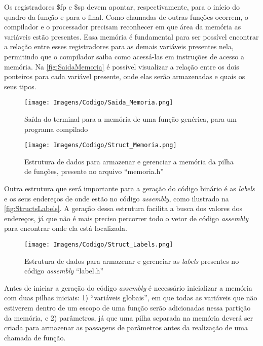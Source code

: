\documentclass[
	12pt,				%
	oneside,
	a4paper,			%
	english,			%
	french,				%
	spanish,			%
	brazil,				%
	]{abntex2}
\begin{document}
Os registradores \$fp e \$sp devem apontar, respectivamente, para o início do quadro da função e para o final. Como chamadas de outras funções ocorrem, o compilador e o processador precisam reconhecer em que área da memória as variáveis estão presentes. Essa memória é fundamental para ser possível encontrar a relação entre esses registradores para as demais variáveis presentes nela, permitindo que o compilador saiba como acessá-las em instruções de acesso a memória. Na \autoref{fig:SaidaMemoria} é possível visualizar a relação entre os dois ponteiros para cada variável presente, onde elas serão armazenadas e quais os seus tipos.

\begin{figure}[tbhp]
\centering 
\caption{Saída do terminal para a memória de uma função genérica, para um programa compilado} 
\label{fig:SaidaMemoria}
\graphicspath{ {./Imagens/} } 
\texttt{[image: Imagens/Codigo/Saida\_Memoria.png]}
\end{figure}

\begin{figure}[tbhp]
\centering 
\caption{Estrutura de dados para armazenar e gerenciar a memória da pilha de funções, presente no arquivo \nohyphens{``memoria.h''}} 
\label{fig:StructsMemoria}
\graphicspath{ {./Imagens/} } 
\texttt{[image: Imagens/Codigo/Struct\_Memoria.png]}
\end{figure}

Outra estrutura que será importante para a geração do código binário é as \emph{labels} e os seus endereços de onde estão no código \emph{assembly}, como ilustrado na \autoref{fig:StructsLabels}. A geração dessa estrutura facilita a busca dos valores dos endereços, já que não é mais preciso percorrer todo o vetor de código \emph{assembly} para encontrar onde ela está localizada.

\begin{figure}[tbhp]
\centering 
\caption{Estrutura de dados para armazenar e gerenciar as \emph{labels} presentes no código \emph{assembly} \nohyphens{``label.h''}} 
\label{fig:StructsLabels}
\graphicspath{ {./Imagens/} } 
\texttt{[image: Imagens/Codigo/Struct\_Labels.png]}
\end{figure}

Antes de iniciar a geração do código \emph{assembly} é necessário inicializar a memória com duas pilhas iniciais: 1) ``variáveis globais'', em que todas as variáveis que não estiverem dentro de um escopo de uma função serão adicionadas nessa partição da memória, e 2) parâmetros, já que uma pilha separada na memória deverá ser criada para armazenar as passagens de parâmetros antes da realização de uma chamada de função. 
\end{document}
